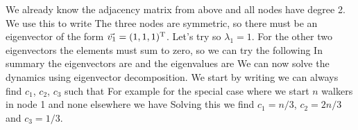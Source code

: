 \solution
We already know the adjacency matrix from above and all nodes have degree 2. We use this to write
The three nodes are symmetric, so there must be an eigenvector of the form $\vec{v_1}=(1,1,1)^{\rm T}$. Let's try
so $\lambda_1=1$. For the other two eigenvectors the elements must sum to zero, so we can try the following 
In summary the eigenvectors are 
and the eigenvalues are 
We can now solve the dynamics using eigenvector decomposition. 
We start by writing
we can always find $c_1$, $c_2$, $c_3$ such that 
For example for the special case where we start $n$ walkers in node 1 and none elsewhere we have 
Solving this we find $c_1=n/3$, $c_2=2n/3$ and $c_3=1/3$.

